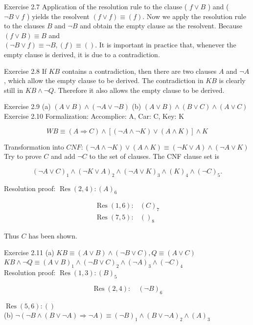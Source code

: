 \documentclass[10pt]{book}
\begin{document}
Exercise 2.7 Application of the resolution rule to the clause ( $f \vee B$ ) and ( $\neg B \vee f$ ) yields the resolvent $(f \vee f) \equiv(f)$. Now we apply the resolution rule to the clauses $B$ and $\neg B$ and obtain the empty clause as the resolvent. Because $(f \vee B) \equiv B$ and\\
$(\neg B \vee f) \equiv \neg B,(f) \equiv()$. It is important in practice that, whenever the empty clause is derived, it is due to a contradiction.


Exercise 2.8 If $K B$ contains a contradiction, then there are two clauses $A$ and $\neg A$, which allow the empty clause to be derived. The contradiction in $K B$ is clearly still in $K B \wedge \neg Q$. Therefore it also allows the empty clause to be derived.

Exercise 2.9 (a) $(A \vee B) \wedge(\neg A \vee \neg B)$ (b) $(A \vee B) \wedge(B \vee C) \wedge(A \vee C)$\\
Exercise 2.10 Formalization: Accomplice: A, Car: C, Key: K

$$
W B \equiv(A \Rightarrow C) \wedge[(\neg A \wedge \neg K) \vee(A \wedge K)] \wedge K
$$

Transformation into $C N F:(\neg A \wedge \neg K) \vee(A \wedge K) \equiv(\neg K \vee A) \wedge(\neg A \vee K)$\\
Try to prove $C$ and add $\neg C$ to the set of clauses. The CNF clause set is

$$
(\neg A \vee C)_{1} \wedge(\neg K \vee A)_{2} \wedge(\neg A \vee K)_{3} \wedge(K)_{4} \wedge(\neg C)_{5} .
$$

Resolution proof: $\operatorname{Res}(2,4):(A)_{6}$

$$
\begin{array}{ll}
\operatorname{Res}(1,6): & (C)_{7} \\
\operatorname{Res}(7,5): & ()_{8}
\end{array}
$$

Thus $C$ has been shown.

Exercise 2.11
(a) $K B \equiv(A \vee B) \wedge(\neg B \vee C), Q \equiv(A \vee C)$\\
$K B \wedge \neg Q \equiv(A \vee B)_{1} \wedge(\neg B \vee C)_{2} \wedge(\neg A)_{3} \wedge(\neg C)_{4}$\\
Resolution proof: $\operatorname{Res}(1,3):(B)_{5}$

$$
\operatorname{Res}(2,4): \quad(\neg B)_{6}
$$

$\operatorname{Res}(5,6):()$\\
(b) $\neg(\neg B \wedge(B \vee \neg A) \Rightarrow \neg A) \equiv(\neg B)_{1} \wedge(B \vee \neg A)_{2} \wedge(A)_{3}$
\end{document}
